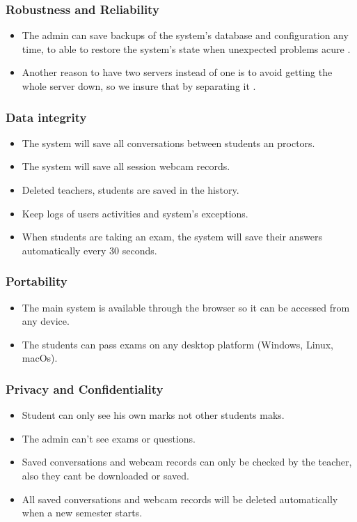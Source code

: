 \documentclass[]{uc2pfecaneva}
\begin{document}
    \raggedright\subsubsection{Robustness and Reliability}
    \begin{itemize}
        \item The admin can save backups of the system’s database and configuration any time, to able to restore the system’s state when  unexpected problems acure .
        \item Another reason to have two servers instead of one is to avoid getting the whole server down, so we insure that by separating it .
    \end{itemize}

    \raggedright\subsubsection{Data integrity}
    \begin{itemize}
        \item The system will save all conversations between students an proctors.
        \item The system will save all session webcam records.
        \item Deleted teachers, students are saved in the history.
        \item Keep logs of users activities and system’s exceptions.
        \item When students are taking an exam, the system will save their answers automatically every 30 seconds.
    \end{itemize}

    \raggedright\subsubsection{Portability}
    \begin{itemize}
        \item The main system is available through the browser so it can be accessed from any device.
        \item The students can pass exams on any desktop platform (Windows, Linux, macOs).
    \end{itemize}

    \raggedright\subsubsection{Privacy and Confidentiality}
    \begin{itemize}
        \item Student can only see his own marks not other students maks.
        \item The admin can’t see exams or questions.
        \item Saved conversations and webcam records can only be checked by the teacher, also they cant be downloaded or saved.
        \item All saved conversations and webcam records will be deleted automatically when a new semester starts.
    \end{itemize}
\end{document}
